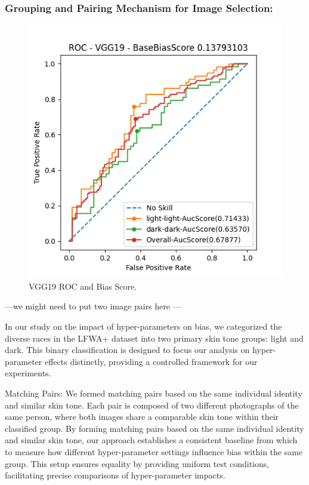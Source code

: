 \documentclass[conference]{IEEEtran}
\begin{document}
\subsubsection{
Grouping and Pairing Mechanism for Image Selection:}

\begin{figure}[htbp]
    \centerline{\includegraphics[width=0.9\linewidth]{latex/images/VGG19.png}}
    \caption{VGG19 ROC and Bias Score.}
    \label{vgg19_roc}
\end{figure}
---we might need to put two image pairs here ---

In our study on the impact of hyper-parameters on bias, we categorized the diverse races in the LFWA+ dataset into two primary skin tone groups: light and dark. This binary classification is designed to focus our analysis on hyper-parameter effects distinctly, providing a controlled framework for our experiments.\cite{liu2015faceattributes}

Matching Pairs: We formed matching pairs based on the same individual identity and similar skin tone. Each pair is composed of two different photographs of the same person, where both images share a comparable skin tone within their classified group. By forming matching pairs based on the same individual identity and similar skin tone, our approach establishes a consistent baseline from which to measure how different hyper-parameter settings influence bias within the same group. This setup ensures equality by providing uniform test conditions, facilitating precise comparisons of hyper-parameter impacts.
\end{document}
